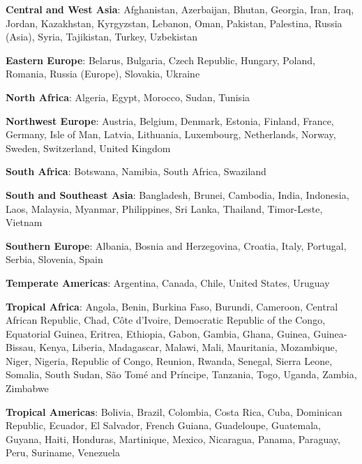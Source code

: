 \item \textbf{Central and West Asia}: Afghanistan, Azerbaijan, Bhutan, Georgia, Iran, Iraq, Jordan, Kazakhstan, Kyrgyzstan, Lebanon, Oman, Pakistan, Palestina, Russia (Asia), Syria, Tajikistan, Turkey, Uzbekistan
\item \textbf{Eastern Europe}: Belarus, Bulgaria, Czech Republic, Hungary, Poland, Romania, Russia (Europe), Slovakia, Ukraine
\item \textbf{North Africa}: Algeria, Egypt, Morocco, Sudan, Tunisia
\item \textbf{Northwest Europe}: Austria, Belgium, Denmark, Estonia, Finland, France, Germany, Isle of Man, Latvia, Lithuania, Luxembourg, Netherlands, Norway, Sweden, Switzerland, United Kingdom
\item \textbf{South Africa}: Botswana, Namibia, South Africa, Swaziland
\item \textbf{South and Southeast Asia}: Bangladesh, Brunei, Cambodia, India, Indonesia, Laos, Malaysia, Myanmar, Philippines, Sri Lanka, Thailand, Timor-Leste, Vietnam
\item \textbf{Southern Europe}: Albania, Bosnia and Herzegovina, Croatia, Italy, Portugal, Serbia, Slovenia, Spain
\item \textbf{Temperate Americas}: Argentina, Canada, Chile, United States, Uruguay
\item \textbf{Tropical Africa}: Angola, Benin, Burkina Faso, Burundi, Cameroon, Central African Republic, Chad, Côte d'Ivoire, Democratic Republic of the Congo, Equatorial Guinea, Eritrea, Ethiopia, Gabon, Gambia, Ghana, Guinea, Guinea-Bissau, Kenya, Liberia, Madagascar, Malawi, Mali, Mauritania, Mozambique, Niger, Nigeria, Republic of Congo, Reunion, Rwanda, Senegal, Sierra Leone, Somalia, South Sudan, São Tomé and Príncipe, Tanzania, Togo, Uganda, Zambia, Zimbabwe
\item \textbf{Tropical Americas}: Bolivia, Brazil, Colombia, Costa Rica, Cuba, Dominican Republic, Ecuador, El Salvador, French Guiana, Guadeloupe, Guatemala, Guyana, Haiti, Honduras, Martinique, Mexico, Nicaragua, Panama, Paraguay, Peru, Suriname, Venezuela
